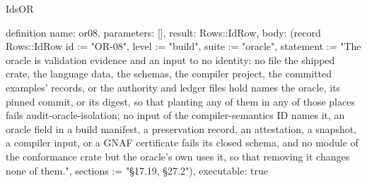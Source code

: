 \begin{lexlean}{IdsOR}
\begin{semanticmodule}
definition{
  name: or08,
  parameters: [],
  result: Rows::IdRow,
  body: (record Rows::IdRow {id := "OR-08", level := "build", suite := "oracle", statement := "The oracle is validation evidence and an input to no identity: no file the shipped crate, the language data, the schemas, the compiler project, the committed examples' records, or the authority and ledger files hold names the oracle, its pinned commit, or its digest, so that planting any of them in any of those places fails audit-oracle-isolation; no input of the compiler-semantics ID names it, an oracle field in a build manifest, a preservation record, an attestation, a snapshot, a compiler input, or a GNAF certificate fails its closed schema, and no module of the conformance crate but the oracle's own uses it, so that removing it changes none of them.", sections := "§17.19, §27.2"}),
  executable: true
}
\end{semanticmodule}
\end{lexlean}
